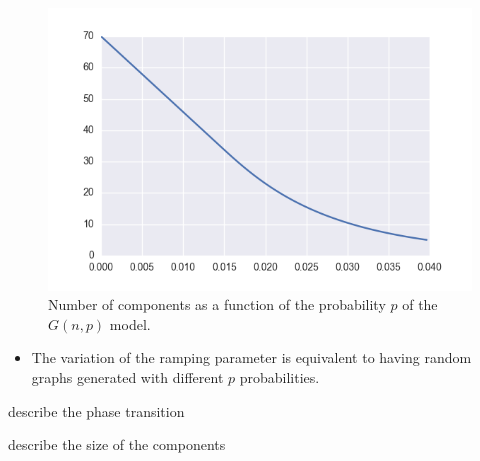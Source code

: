 








\begin{figure}[tb]
	\centering
	\includegraphics[]{figures/gnp_number_components.png}
	\caption{Number of components as a function of the probability $p$ of the $G(n,p)$ model.}
	\label{fig:figure1}
\end{figure}


\begin{itemize}
	\item The variation of the ramping parameter is equivalent to having random graphs generated with different $p$ probabilities.
\end{itemize}


describe the phase transition


describe the size of the components


